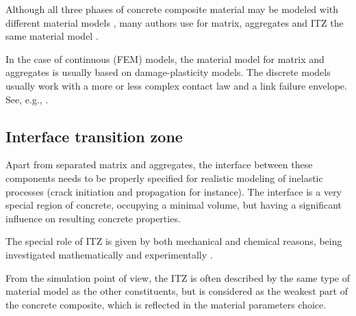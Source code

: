 Although all three phases of concrete composite material may be modeled with different material models
\cite{%
	ZhouHao2008a,%
}, many authors use for matrix, aggregates and ITZ the same material model
\cite{%
	GrohKonietzkyWalterHerbst2011a,%
	KimAlrub2011a,%
	SatohYamadaIshiyama2013a,%
	WangLinGu2008a,%
}.

In the case of continuous (FEM) models, the material model for matrix and aggregates is usually based on damage-plasticity models.
The discrete models usually work with a more or less complex contact law and a link failure envelope.
See, e.g.,
\cite{%
	IbrahimbegovicDelaplace2003a,%
	TranDonzeMarin2011a,%
	WangLinGu2008a%
}.


\subsection{Interface transition zone}
Apart from separated matrix and aggregates, the interface between these components needs to be properly specified for realistic modeling of inelastic processes (crack initiation and propagation for instance).
The interface is a very special region of concrete, occupying a minimal volume, but having a significant influence on resulting concrete properties.

The special role of ITZ is given by both mechanical and chemical reasons, being investigated mathematically and experimentally
\cite{%
	ErdemDawsonThom2012a,%
	GiaccioZerbinoPonceBatic2008a,%
}.

From the simulation point of view, the ITZ is often described by the same type of material model as the other constituents, but is considered as the weakest part of the concrete composite, which is reflected in the material parameters choice.
